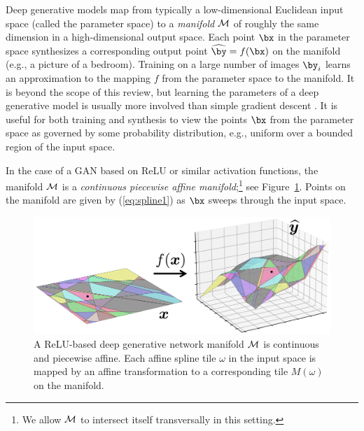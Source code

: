 \documentclass{notices}
\begin{document}
Deep generative models map from typically a low-dimensional Euclidean input space (called the parameter space) to a {\em manifold} ${\cal M}$ of roughly the same dimension in a high-dimensional output space.
Each point $\bx$ in the parameter space synthesizes a corresponding output point $\widehat{\by}= f(\bx)$ on the manifold (e.g., a picture of a bedroom).
Training on a large number of images $\by_i$ learns an approximation to the mapping $f$ from the parameter space to the manifold. 
It is beyond the scope of this review, but learning the parameters of a deep generative model is usually more involved than simple gradient descent \cite{goodfellow2016deep}.
It is useful for both training and synthesis to view the points $\bx$ from the parameter space as governed by some probability distribution, e.g., uniform over a bounded region of the input space.

In the case of a GAN based on ReLU or similar activation functions, the manifold ${\cal M}$ is a {\em continuous piecewise affine manifold};\footnote{We allow ${\cal M}$ to intersect itself transversally in this setting.} see Figure~\ref{fig:manifold}.
Points on the manifold are given by (\ref{eq:spline1}) as $\bx$ sweeps through the input space.


\begin{figure}[h]
    \centering  
\includegraphics[width=1\linewidth]{Figs/manifold4.png}
\vspace*{-5mm}
    \caption{\small
    A ReLU-based deep generative network manifold ${\cal M}$ is continuous and piecewise affine.
    Each affine spline tile $\omega$ in the input space is mapped by an affine transformation to a corresponding tile $M(\omega)$ on the manifold.}
    \label{fig:manifold}
\end{figure}
\end{document}

